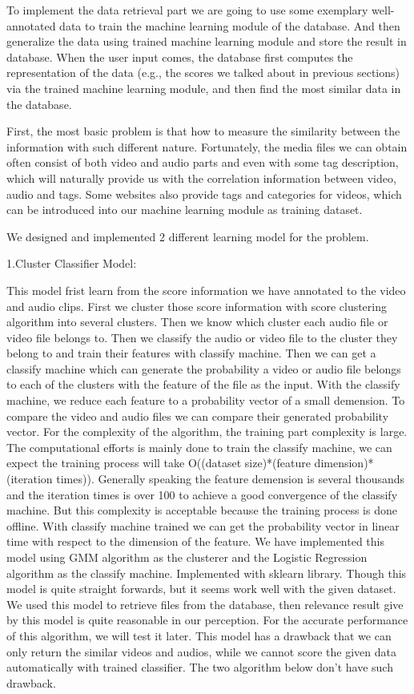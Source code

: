 \documentclass{report}
\begin{document}
To implement the data retrieval part we are going to use some exemplary well-annotated data to train the machine learning module of the database. And then generalize the data using trained machine learning module and store the result in database. When the user input comes, the database first computes the representation of the data (e.g., the scores we talked about in previous sections) via the trained machine learning module, and then find the most similar data in the database.

First, the most basic problem is that how to measure the similarity between the information with such different nature. Fortunately, the media files we can obtain often consist of both video and audio parts and even with some tag description, which will naturally provide us with the correlation information between video, audio and tags. Some websites also provide tags and categories for videos, which can be introduced into our machine learning module as training dataset.
 
We designed and implemented 2 different learning model for the problem.

1.Cluster Classifier Model:

This model frist learn from the score information we have annotated to the video and audio clips. First we cluster those score information with score clustering algorithm into several clusters. Then we know which cluster each audio file or video file belongs to. Then we classify the audio or video file to the cluster they belong to and train their features with classify machine. Then we can get a classify machine which can generate the probability a video or audio file belongs to each of the clusters with the feature of the file as the input. With the classify machine, we reduce each feature to a probability vector of a small demension. To compare the video and audio files we can compare their generated probability vector. 
For the complexity of the algorithm, the training part complexity is large. The computational efforts is mainly done to train the classify machine, we can expect the training process will take O((dataset size)*(feature dimension)*(iteration times)). Generally speaking the feature demension is several thousands and the iteration times is over 100 to achieve a good convergence of the classify machine. But this complexity is acceptable because the training process is done offline. With classify machine trained we can get the probability vector in linear time with respect to the dimension of the feature.
We have implemented this model using GMM algorithm as the clusterer and the Logistic Regression algorithm as the classify machine. Implemented with sklearn library.
Though this model is quite straight forwards, but it seems work well with the given dataset. We used this model to retrieve files from the database, then relevance result give by this model is quite reasonable in our perception. For the accurate performance of this algorithm, we will test it later.
This model has a drawback that we can only return the similar videos and audios, while we cannot score the given data automatically with trained classifier. The two algorithm below don’t have such drawback.
\end{document}
